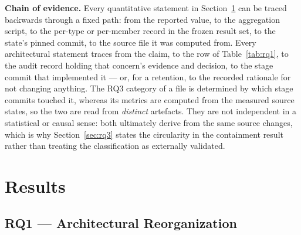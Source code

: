 \documentclass[pdflatex,sn-basic]{sn-jnl}
\begin{document}
\medskip\noindent\textbf{Chain of evidence.} Every quantitative statement in Section~\ref{sec:results} can be traced backwards through a fixed path: from the reported value, to the aggregation script, to the per-type or per-member record in the frozen result set, to the state's pinned commit, to the source file it was computed from. Every architectural statement traces from the claim, to the row of Table~\ref{tab:rq1}, to the audit record holding that concern's evidence and decision, to the stage commit that implemented it --- or, for a retention, to the recorded rationale for not changing anything. The RQ3 category of a file is determined by which stage commits touched it, whereas its metrics are computed from the measured source states, so the two are read from \emph{distinct} artefacts. They are not independent in a statistical or causal sense: both ultimately derive from the same source changes, which is why Section~\ref{sec:rq3} states the circularity in the containment result rather than treating the classification as externally validated.


\section{Results}\label{sec:results}

\subsection{RQ1 --- Architectural Reorganization}\label{sec:rq1}
\end{document}
